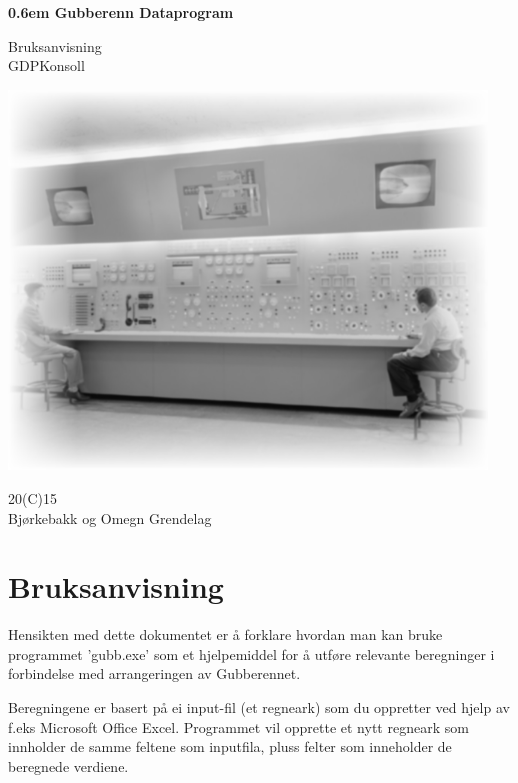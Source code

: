 \documentclass[12pt]{book}
\begin{document}
\clearpage

\newcommand\nbvspace[1][3]{\vspace*{\stretch{#1}}}
\newcommand\nbstretchyspace{\spaceskip0.5em plus 0.25em minus 0.25em}
\newcommand{\nbtitlestretch}{\spaceskip0.6em}
\pagestyle{empty}
\begin{center}
\bfseries
\nbvspace[1]
\Huge
{\nbtitlestretch\huge
Gubberenn Dataprogram \\}

\nbvspace[10]
\normalsize

Bruksanvisning\\
GDPKonsoll\\

\nbvspace[2]

\includegraphics[width=5.0in]{gubb}
\nbvspace[15]
\normalsize

20(C)15\\
\large
Bjørkebakk og Omegn Grendelag
\nbvspace[1]
\end{center}

\tableofcontents

\chapter{Bruksanvisning}

Hensikten med dette dokumentet er å forklare hvordan man kan bruke programmet 'gubb.exe' som et hjelpemiddel for å utføre relevante beregninger i forbindelse med arrangeringen av Gubberennet.

Beregningene er basert på ei input-fil (et regneark) som du oppretter ved hjelp av f.eks Microsoft Office Excel. Programmet vil opprette et nytt regneark som innholder de samme feltene som inputfila, pluss felter som inneholder de beregnede verdiene.
\end{document}

